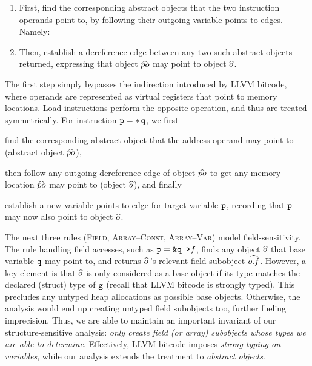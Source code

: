 \begin{enumerate}
\item First, find the corresponding abstract objects that the two
  instruction operands point to, by following their outgoing variable
  points-to edges. Namely:
\item Then, establish a dereference edge between any two such abstract
  objects returned, expressing that object $\widehat{po}$ may point to
  object $\widehat{o}$.
\end{enumerate}
The first step simply bypasses the indirection introduced by LLVM
bitcode, where operands are represented as virtual registers that
point to memory locations.
Load instructions perform the opposite operation, and thus are treated
symmetrically. For instruction $\loadinstr{p}{q}$, we first
\begin{inparaenum}[(i)]
\item find the corresponding abstract object that the address operand
  may point to (abstract object $\widehat{po}$),
\item then follow any outgoing dereference edge of object $\widehat{po}$
  to get any memory location $\widehat{po}$ may point to (object
  $\widehat{o}$), and finally
\item establish a new variable points-to edge for target variable
  $\texttt{p}$, recording that $\texttt{p}$ may now also point to object
  $\widehat{o}$.
\end{inparaenum}

The next three rules (\textsc{Field, Array--Const, Array--Var}) model field-sensitivity. The rule
handling field accesses, such as $\fieldaccess{p}{q}{f}$, finds any
object $\widehat{o}$ that base variable $\texttt{q}$ may point to, and
returns $\widehat{o}\,$'s relevant field subobject
$\widehat{o.f}$. However, a key element is that $\widehat{o}$
is only considered as a base object if its type matches the declared
(struct) type of $\texttt{g}$ (recall that LLVM bitcode is strongly
typed). This precludes any untyped heap allocations as possible base
objects. Otherwise, the analysis would end up creating untyped field
subobjects too, further fueling imprecision. Thus, we are able to
maintain an important invariant of our structure-sensitive analysis:
\emph{only create field (or array) subobjects whose types we are able
  to determine}. Effectively, LLVM bitcode  imposes
\emph{strong typing on variables}, while our analysis extends the treatment
to \emph{abstract objects}.

